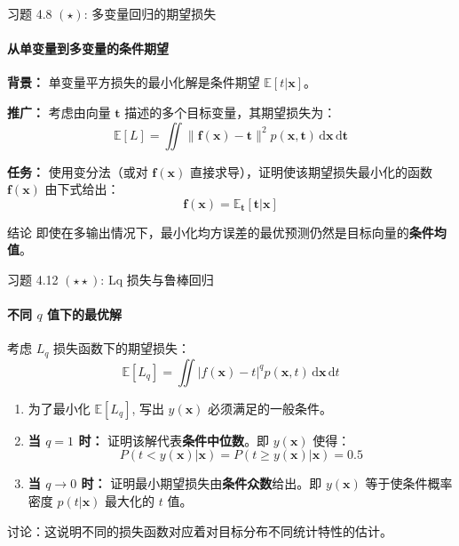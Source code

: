 \documentclass[12pt, aspectratio=169]{beamer}
\begin{document}
\begin{frame}{习题 4.8 $(\star)$: 多变量回归的期望损失}
    \framesubtitle{从单变量到多变量的条件期望}
    
    \textbf{背景：}
    单变量平方损失的最小化解是条件期望 $\mathbb{E}[t|\mathbf{x}]$。
    
    \textbf{推广：}
    考虑由向量 $\mathbf{t}$ 描述的多个目标变量，其期望损失为：
    \begin{equation}
        \mathbb{E}[L] = \iint \lVert\mathbf{f}(\mathbf{x}) - \mathbf{t}\rVert^2 p(\mathbf{x}, \mathbf{t}) \,\mathrm{d}\mathbf{x}\,\mathrm{d}\mathbf{t}
    \end{equation}
    
    \textbf{任务：}
    使用变分法（或对 $\mathbf{f}(\mathbf{x})$ 直接求导），证明使该期望损失最小化的函数 $\mathbf{f}(\mathbf{x})$ 由下式给出：
    \begin{equation}
        \mathbf{f}(\mathbf{x}) = \mathbb{E}_{\mathbf{t}}[\mathbf{t}|\mathbf{x}]
    \end{equation}
    
    \begin{alertblock}{结论}
        即使在多输出情况下，最小化均方误差的最优预测仍然是目标向量的\textbf{条件均值}。
    \end{alertblock}
\end{frame}

\begin{frame}{习题 4.12 $(\star\star)$: Lq 损失与鲁棒回归}
    \framesubtitle{不同 $q$ 值下的最优解}
    
    考虑 $L_q$ 损失函数下的期望损失：
    \begin{equation}
        \mathbb{E}[L_q] = \iint \lvert f(\mathbf{x}) - t\rvert^q p(\mathbf{x}, t) \,\mathrm{d}\mathbf{x}\,\mathrm{d}t
    \end{equation}
    
    \begin{enumerate}
        \item 为了最小化 $\mathbb{E}[L_q]$, 写出 $y(\mathbf{x})$ 必须满足的一般条件。
        \item \textbf{当 $q=1$ 时：}
        证明该解代表\textbf{条件中位数}。即 $y(\mathbf{x})$ 使得：
        \[ P(t < y(\mathbf{x}) | \mathbf{x}) = P(t \ge y(\mathbf{x}) | \mathbf{x}) = 0.5 \]
        \item \textbf{当 $q \to 0$ 时：}
        证明最小期望损失由\textbf{条件众数}给出。即 $y(\mathbf{x})$ 等于使条件概率密度 $p(t|\mathbf{x})$ 最大化的 $t$ 值。
    \end{enumerate}
    
    \vspace{0.5em}
    \footnotesize{讨论：这说明不同的损失函数对应着对目标分布不同统计特性的估计。}
\end{frame}
\end{document}
